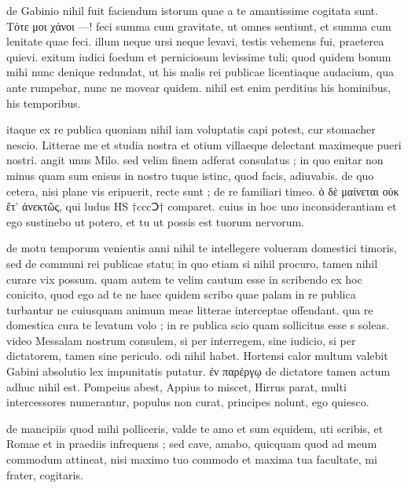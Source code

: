 


 de Gabinio nihil fuit faciendum istorum quae a te amantissime cogitata sunt. Τότε μοι χάνοι —! feci summa cum gravitate, ut omnes sentiunt, et summa cum lenitate quae feci. illum neque ursi neque levavi, testis vehemens fui, praeterea quievi. exitum iudici foedum et perniciosum levissime tuli; quod quidem bonum mihi nunc denique redundat, ut his malis rei publicae licentiaque audacium, qua ante rumpebar, nunc ne movear quidem. nihil est enim perditius his hominibus, his temporibus.

 itaque ex re publica quoniam nihil iam voluptatis capi potest, cur stomacher nescio. Litterae me et studia nostra et otium villaeque delectant maximeque pueri nostri. angit unus Milo. sed velim finem adferat consulatus ; in quo enitar non minus quam sum enisus in nostro tuque istinc, quod facis, adiuvabis. de quo cetera, nisi plane vis eripuerit, recte sunt ; de re familiari timeo. ὁ δὲ μαίνεται οὐκ ἔτ' ἀνεκτῶς, qui ludus HS †cccↃ† comparet. cuius in hoc uno inconsiderantiam et ego sustinebo ut potero, et tu ut possis est tuorum nervorum.

 de motu temporum venientis anni nihil te intellegere volueram domestici timoris, sed de communi rei publicae statu; in quo etiam si nihil procuro, tamen nihil curare vix possum. quam autem te velim cautum esse in scribendo ex hoc conicito, quod ego ad te ne haec quidem scribo quae palam in re publica turbantur ne cuiusquam animum meae litterae interceptae offendant. qua re domestica cura te levatum volo ; in re publica scio quam sollicitus esse s soleas. video Messalam nostrum consulem, si per interregem, sine iudicio, si per dictatorem, tamen sine periculo. odi nihil habet. Hortensi calor multum valebit Gabini absolutio lex impunitatis putatur. ἐν παρέργῳ de dictatore tamen actum adhuc nihil est. Pompeius abest, Appius to miscet, Hirrus parat, multi intercessores numerantur, populus non curat, principes nolunt, ego quiesco.

 de mancipiis quod mihi polliceris, valde te amo et sum equidem, uti scribis, et Romae et in praediis infrequens ; sed cave, amabo, quicquam quod ad meum commodum attineat, nisi maximo tuo commodo et maxima tua facultate, mi frater, cogitaris.

